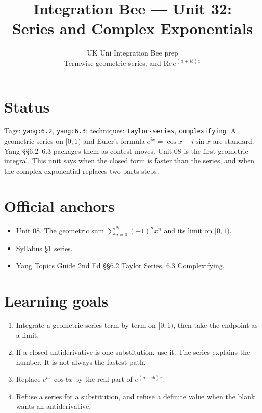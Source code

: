 
\title{Integration Bee --- Unit 32:\\ Series and Complex Exponentials}
\author{UK Uni Integration Bee prep\\ Termwise geometric series, and $\mathrm{Re}\,e^{(a+ib)x}$}
\date{}

\maketitle
\section*{Status}
Tags: \texttt{yang:6.2}, \texttt{yang:6.3}; techniques: \texttt{taylor-series}, \texttt{complexifying}.
A geometric series on $[0,1)$ and Euler's formula $e^{ix}=\cos x+i\sin x$ are standard. Yang \S\S6.2--6.3 packages them as contest moves. Unit 08 is the first geometric integral. This unit says when the closed form is faster than the series, and when the complex exponential replaces two parts steps.
\section{Official anchors}
\begin{itemize}
\item Unit 08. The geometric sum $\sum_{n=0}^{N}(-1)^n x^n$ and its limit on $[0,1)$.
\item Syllabus \S1 series.
\item Yang Topics Guide 2nd Ed \S\S6.2 Taylor Series, 6.3 Complexifying.
\end{itemize}
\section{Learning goals}
\begin{enumerate}
  \item Integrate a geometric series term by term on $[0,1)$, then take the endpoint as a limit.
  \item If a closed antiderivative is one substitution, use it. The series explains the number. It is not always the fastest path.
  \item Replace $e^{ax}\cos bx$ by the real part of $e^{(a+ib)x}$.
  \item Refuse a series for a substitution, and refuse a definite value when the blank wants an antiderivative.
\end{enumerate}

